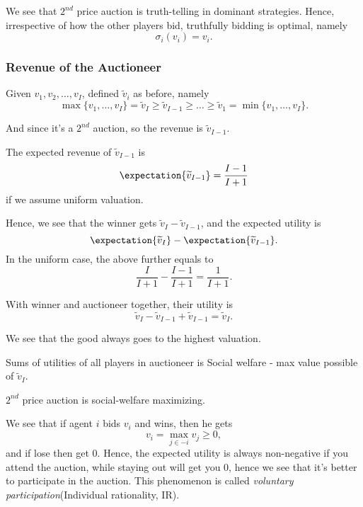 \begin{remark}
	We see that \(2^{nd}\) price auction is truth-telling in dominant strategies. Hence, irrespective of how the other players bid, truthfully bidding is optimal, namely
	\[
		\sigma_{i}(v_{i}) = v_{i}.
	\]
\end{remark}
\subsubsection{Revenue of the Auctioneer}
Given \(v_1, v_2, \ldots , v_I\), defined \(\widetilde{v}_i\) as before, namely
\[
	\max\{v_1, \ldots , v_I\} = \widetilde{v}_{I}\geq \widetilde{v}_{I-1}\geq \ldots \geq \widetilde{v}_1 = \min\{v_1, \ldots , v_I\}.
\]

And since it's a \(2^{nd}\) auction, so the revenue is \(\widetilde{v}_{I - 1}\).

\begin{note}
	The expected revenue of \(\widetilde{v}_{I - 1}\) is
	\[
		\expectation{\widetilde{v}_{I-1}} = \frac{I-1}{I+1}
	\]
	if we assume uniform valuation.
\end{note}

Hence, we see that the winner gets \(\widetilde{v}_{I} - \widetilde{v}_{I-1}\), and the expected utility is
\[
	\expectation{\widetilde{v}_{I}} - \expectation{\widetilde{v}_{I - 1}}.
\]
In the uniform case, the above further equals to
\[
	\frac{I}{I+1} - \frac{I - 1}{I + 1} = \frac{1}{I+1}.
\]

With winner and auctioneer together, their utility is
\[
	\widetilde{v}_{I} - \widetilde{v}_{I - 1}+\widetilde{v}_{I - 1} = \widetilde{v}_{I}.
\]

\begin{remark}
	We see that the good always goes to the highest valuation.
\end{remark}

\hr

Sums of utilities of all players in auctioneer is Social welfare - max value possible of \(\widetilde{v}_{I}\).

\begin{remark}
	\(2^{nd}\) price auction is social-welfare maximizing.
\end{remark}

We see that if agent \(i\) bids \(v_{i}\) and wins, then he gets
\[
	v_{i} = \max_{j\in -i} v_{j}\geq 0,
\]
and if lose then get \(0\). Hence, the expected utility is always non-negative if you attend the auction, while staying out will get you \(0\), hence
we see that it's better to participate in the auction. This phenomenon is called \emph{voluntary participation}(Individual rationality, IR).


